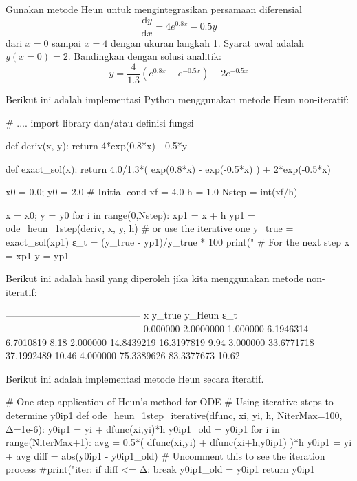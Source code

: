 \begin{soal}
Gunakan metode Heun untuk mengintegrasikan persamaan diferensial
\begin{equation*}
\frac{\mathrm{d}y}{\mathrm{d}x} = 4e^{0.8x} - 0.5y
\end{equation*}
dari $x=0$ sampai $x=4$ dengan ukuran langkah 1. Syarat awal adalah
$y(x=0) = 2$.
Bandingkan dengan solusi analitik:
\begin{equation*}
y = \frac{4}{1.3} \left( e^{0.8x} - e^{-0.5x} \right) + 2e^{-0.5x}
\end{equation*}
\end{soal}


Berikut ini adalah implementasi Python menggunakan metode Heun non-iteratif:
\begin{pythoncode}
# .... import library dan/atau definisi fungsi

def deriv(x, y):
    return 4*exp(0.8*x) - 0.5*y
    
def exact_sol(x):
    return 4.0/1.3*( exp(0.8*x) - exp(-0.5*x) ) + 2*exp(-0.5*x)

x0 = 0.0; y0 = 2.0 # Initial cond
xf = 4.0
h = 1.0
Nstep = int(xf/h)
    
x = x0; y = y0
for i in range(0,Nstep):
    xp1 = x + h
    yp1 = ode_heun_1step(deriv, x, y, h) # or use the iterative one
    y_true = exact_sol(xp1)
    ε_t = (y_true - yp1)/y_true * 100
    print("%
    # For the next step
    x = xp1
    y = yp1    
\end{pythoncode}



Berikut ini adalah hasil yang diperoleh jika kita menggunakan metode
non-iteratif:
\begin{textcode}
------------------------------------------
  x         y_true        y_Heun      ε_t
------------------------------------------
0.000000    2.0000000
1.000000    6.1946314    6.7010819   8.18%
2.000000   14.8439219   16.3197819   9.94%
3.000000   33.6771718   37.1992489  10.46%
4.000000   75.3389626   83.3377673  10.62%
\end{textcode}


Berikut ini adalah implementasi metode Heun secara iteratif.
\begin{pythoncode}
# One-step application of Heun's method for ODE
# Using iterative steps to determine y0ip1
def ode_heun_1step_iterative(dfunc, xi, yi, h, NiterMax=100, Δ=1e-6):
    y0ip1 = yi + dfunc(xi,yi)*h
    y0ip1_old = y0ip1
    for i in range(NiterMax+1):
        avg = 0.5*( dfunc(xi,yi) + dfunc(xi+h,y0ip1) )*h
        y0ip1 = yi + avg
        diff = abs(y0ip1 - y0ip1_old)
        # Uncomment this to see the iteration process
        #print("iter: %
        if diff <= Δ:
            break
        y0ip1_old = y0ip1
    return y0ip1
\end{pythoncode}

